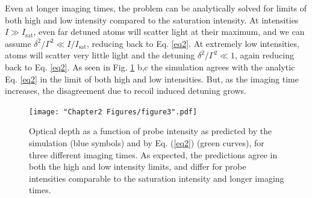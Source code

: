 Even at longer imaging times, the problem can be analytically solved for limits of both high and low intensity compared to the saturation intensity.  At intensities $I\gg I_{\mathrm{sat}}$, even far detuned atoms will scatter light at their maximum, and we can assume $\delta^2/\Gamma^2 \ll I/I_{\mathrm{sat}}$, reducing back to Eq. \ref{eq2}. At extremely low intensities, atoms will scatter very little light and the detuning $\delta^2/\Gamma^2 \ll 1$, again reducing back to Eq. \ref{eq2}. As seen in Fig. \ref{fig:IsatLimits} b,c the simulation agrees with the analytic Eq. \ref{eq2} in the limit of both high and low intensities. But, as the imaging time increases, the disagreement due to recoil induced detuning grows.
%
\begin{figure}
	\texttt{[image: "Chapter2 Figures/figure3".pdf]}
\caption{Optical depth as a function of probe intensity as predicted by the simulation (blue symbols) and by Eq. (\ref{eq2}) (green curves), for three different imaging times. As expected, the predictions agree in both the high and low intensity limits, and differ for probe intensities comparable to the saturation intensity and longer imaging times. }
\label{fig:IsatLimits}
\end{figure}

